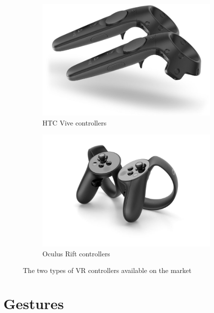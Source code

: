 \documentclass[12pt,a4paper,twoside]{report}
\begin{document}
\begin{figure}[h]
  \centering
  \begin{subfigure}{0.45\textwidth}
    \includegraphics[width=\linewidth]{img/Vive_controllers.jpg}
    \caption{HTC Vive controllers}
    \label{fig:vive_controllers}
  \end{subfigure}
  \begin{subfigure}{0.45\textwidth}
    \includegraphics[width=\linewidth]{img/Oculus_controllers.jpg}
    \caption{Oculus Rift controllers}
    \label{fig:leap_interaction}
  \end{subfigure}
  \caption{The two types of VR controllers available on the market}
  \label{mfig:vive_occulus}
\end{figure}

\section{Gestures}
\end{document}
